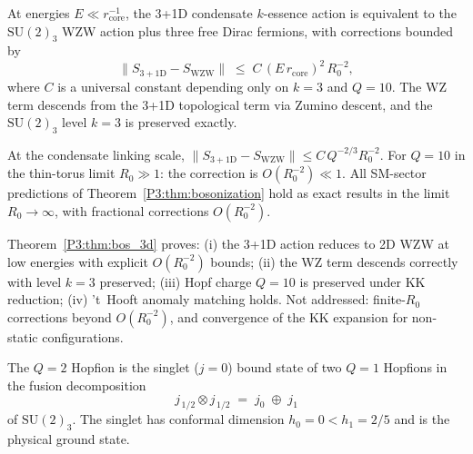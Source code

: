 \begin{theorem}
\label{P3:thm:bos_3d}
At energies $E\ll r_{\mathrm{core}}^{-1}$, the 3+1D condensate $k$-essence
action is equivalent to the $\mathrm{SU}(2)_3$ WZW action plus three free
Dirac fermions, with corrections bounded by
\begin{equation}
  \bigl\|S_{3+1\mathrm{D}} - S_{\mathrm{WZW}}\bigr\|
  \;\leq\; C\,(E\,r_{\mathrm{core}})^2\,R_0^{-2},
  \label{P3:eq:bos_bound}
\end{equation}
where $C$ is a universal constant depending only on $k=3$ and $Q=10$.
The WZ term descends from the 3+1D topological term via Zumino descent, and
the $\mathrm{SU}(2)_3$ level $k=3$ is preserved exactly.
\end{theorem}

\begin{corollary}
\label{P3:cor:bos_valid}
At the condensate linking scale, $\|S_{3+1\mathrm{D}}-S_{\mathrm{WZW}}\|
\leq C\,Q^{-2/3}R_0^{-2}$.  For $Q=10$ in the thin-torus limit
$R_0\gg 1$: the correction is $O(R_0^{-2})\ll 1$.
All SM-sector predictions of Theorem~\ref{P3:thm:bosonization} hold as exact
results in the limit $R_0\to\infty$, with fractional corrections $O(R_0^{-2})$.
\end{corollary}

\begin{remark}
\label{P3:rem:bos3d_scope}
Theorem~\ref{P3:thm:bos_3d} proves: (i) the 3+1D action reduces to 2D WZW at
low energies with explicit $O(R_0^{-2})$ bounds; (ii) the WZ term descends
correctly with level $k=3$ preserved; (iii) Hopf charge $Q=10$ is preserved
under KK reduction; (iv) 't~Hooft anomaly matching holds.
Not addressed: finite-$R_0$ corrections beyond $O(R_0^{-2})$, and
convergence of the KK expansion for non-static configurations.
\end{remark}

\begin{proposition}[$Q=2$ sector assignment]
\label{P3:prop:q2_sector}
The $Q=2$ Hopfion is the singlet ($j=0$) bound state of two $Q=1$ Hopfions
in the fusion decomposition
\begin{equation}
  j_{\,1/2} \otimes j_{\,1/2} \;=\; j_0 \;\oplus\; j_1
  \label{P3:eq:fusion}
\end{equation}
of $\mathrm{SU}(2)_3$.  The singlet has conformal dimension $h_0=0 < h_1=2/5$
and is the physical ground state.
\end{proposition}


